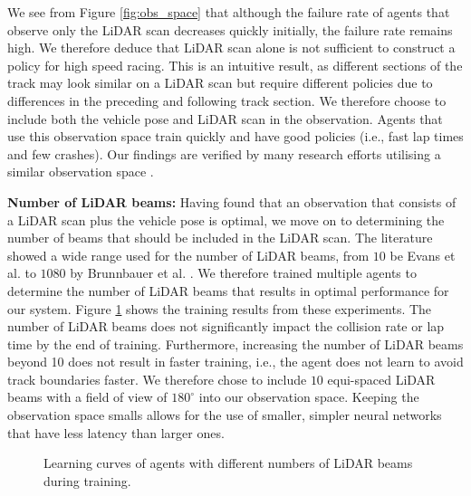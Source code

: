We see from Figure \ref{fig:obs_space} that although the failure rate of agents that observe only the LiDAR scan decreases quickly initially, the failure rate remains high.
We therefore deduce that LiDAR scan alone is not sufficient to construct a policy for high speed racing.
This is an intuitive result, as different sections of the track may look similar on a LiDAR scan but require different policies due to differences in the preceding and following track section.
We therefore choose to include both the vehicle pose and LiDAR scan in the observation.
Agents that use this observation space train quickly and have good policies (i.e., fast lap times and few crashes).
Our findings are verified by many research efforts utilising a similar observation space \cite{Song2021,  Fuchs2021, Ivanov2020, Schwarting2021, Niu2020, hsu2022, Chisari2021, Remonda2021}.


\textbf{Number of LiDAR beams:}
Having found that an observation that consists of a LiDAR scan plus the vehicle pose is optimal, we move on to determining the number of beams that should be included in the LiDAR scan.
The literature showed a wide range used for the number of LiDAR beams, from $10$ be Evans et al. \cite{Evans2021b} to $1080$ by Brunnbauer et al. \cite{brunnbauer2021}.
We therefore trained multiple agents to determine the number of LiDAR beams that results in optimal performance for our system.
Figure \ref{fig:n_beams} shows the training results from these experiments.
The number of LiDAR beams does not significantly impact the collision rate or lap time by the end of training.
Furthermore, increasing the number of LiDAR beams beyond 10 does not result in faster training, i.e., the agent does not learn to avoid track boundaries faster.
We therefore chose to include $10$ equi-spaced LiDAR beams with a field of view of $180^{\circ}$
into our observation space.
Keeping the observation space smalls allows for the use of smaller, simpler neural networks that have less latency than larger ones.

\begin{figure}[htb!]
    \centering
    
    \caption{Learning curves of agents with different numbers of LiDAR beams during training.}
    \label{fig:n_beams}
\end{figure}

